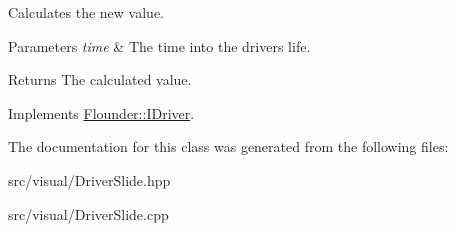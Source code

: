 Calculates the new value. 


\begin{DoxyParams}{Parameters}
{\em time} & The time into the drivers life. \\
\hline
\end{DoxyParams}
\begin{DoxyReturn}{Returns}
The calculated value. 
\end{DoxyReturn}


Implements \hyperlink{class_flounder_1_1_i_driver_a969f0c8da089f9d17129ee12b40c354a}{Flounder\+::\+I\+Driver}.



The documentation for this class was generated from the following files\+:\begin{DoxyCompactItemize}
\item 
src/visual/Driver\+Slide.\+hpp\item 
src/visual/Driver\+Slide.\+cpp\end{DoxyCompactItemize}
